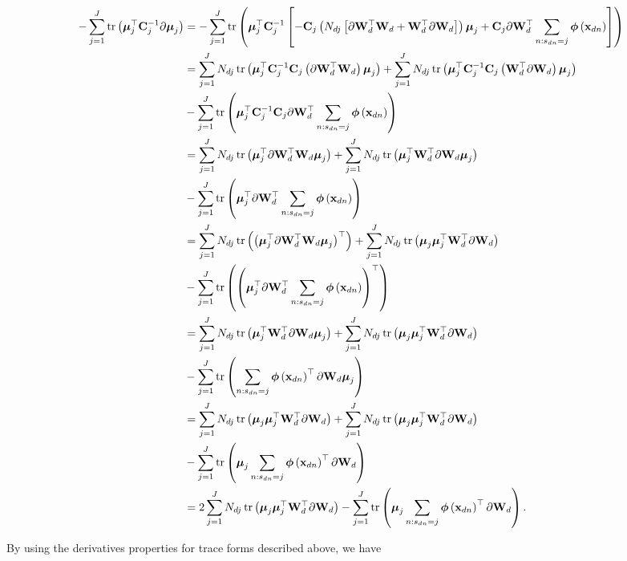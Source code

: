	\begin{align}
	-\sum_{j=1}^{J}\tr\left( \muJ^\top\Cin^{-1}\partial\muJ\right) &=-\sum_{j=1}^{J}\tr\left( \muJ^\top\Cin^{-1}\left[-\Cin\left(N_{dj}\left[\partial\projMatI^\top\projMatI+\projMatI^\top\partial\projMatI\right]\right)\muJ+\Cin\partial\projMatI^\top\sum_{n:s_{dn}=j}\phixnd\right]\right) \notag \\
	&= \sum_{j=1}^{J}N_{dj}\tr\left(\muJ^\top\Cin^{-1}\Cin\left(\partial\projMatI^\top\projMatI\right)\muJ\right) +  \sum_{j=1}^{J}N_{dj}\tr\left(\muJ^\top\Cin^{-1}\Cin\left(\projMatI^\top\partial\projMatI\right)\muJ\right) \notag\\
	&-\sum_{j=1}^{J}\tr\left(\muJ^\top\Cin^{-1}\Cin\partial\projMatI^\top\sum_{n:s_{dn}=j}\phixnd\right) \notag \\
	&= \sum_{j=1}^{J}N_{dj}\tr\left(\muJ^\top\partial\projMatI^\top\projMatI\muJ\right) +  \sum_{j=1}^{J}N_{dj}\tr\left(\muJ^\top\projMatI^\top\partial\projMatI\muJ\right) \notag\\
	&-\sum_{j=1}^{J}\tr\left(\muJ^\top\partial\projMatI^\top\sum_{n:s_{dn}=j}\phixnd\right) \notag \\
	&= \sum_{j=1}^{J}N_{dj}\tr\left(\left(\muJ^\top\partial\projMatI^\top\projMatI\muJ\right)^\top\right) +  \sum_{j=1}^{J}N_{dj}\tr\left(\muJ\muJ^\top\projMatI^\top\partial\projMatI\right) \notag\\
	&-\sum_{j=1}^{J}\tr\left(\left(\muJ^\top\partial\projMatI^\top\sum_{n:s_{dn}=j}\phixnd\right)^\top\right) \notag \\
	&= \sum_{j=1}^{J}N_{dj}\tr\left(\muJ^\top\projMatI^\top\partial\projMatI\muJ\right) +  \sum_{j=1}^{J}N_{dj}\tr\left(\muJ\muJ^\top\projMatI^\top\partial\projMatI\right) \notag\\
	&-\sum_{j=1}^{J}\tr\left(\sum_{n:s_{dn}=j}\phixnd^\top\partial\projMatI\muJ\right) \notag \\
	&= \sum_{j=1}^{J}N_{dj}\tr\left(\muJ\muJ^\top\projMatI^\top\partial\projMatI\right) +  \sum_{j=1}^{J}N_{dj}\tr\left(\muJ\muJ^\top\projMatI^\top\partial\projMatI\right) \notag\\
	&-\sum_{j=1}^{J}\tr\left(\muJ\sum_{n:s_{dn}=j}\phixnd^\top\partial\projMatI\right) \notag \\
	&= 2\sum_{j=1}^{J}N_{dj}\tr\left(\muJ\muJ^\top\projMatI^\top\partial\projMatI\right)-\sum_{j=1}^{J}\tr\left(\muJ\sum_{n:s_{dn}=j}\phixnd^\top\partial\projMatI\right) .
	\end{align}
	
	
	By using the derivatives properties for trace forms described above, we have
	
